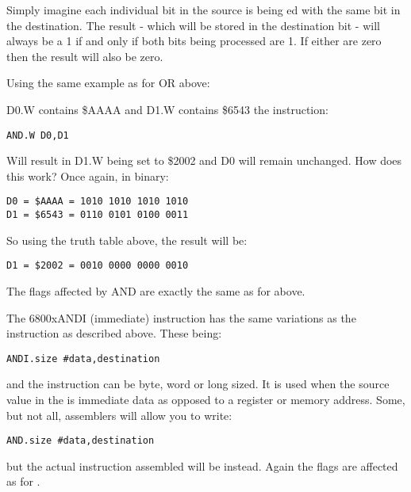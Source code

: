Simply imagine each individual bit in the source is being ed with
    the same bit in the destination. The result -{} which will be stored in the
    destination bit -{} will always be a 1 if and only if both bits being
    processed are 1. If either are zero then the result will also be
    zero.

Using the same example as for OR above:

D0.W contains \$AAAA and D1.W contains \$6543 the instruction:

\begin{lstlisting}[firstnumber=1,]
          AND.W D0,D1
\end{lstlisting}

Will result in D1.W being set to \$2002 and D0 will remain unchanged.
    How does this work? Once again, in binary:

\begin{lstlisting}[firstnumber=1,frame=none,numbers=none]
D0 = $AAAA = 1010 1010 1010 1010
D1 = $6543 = 0110 0101 0100 0011
\end{lstlisting}

So using the truth table above, the result will be:

\begin{lstlisting}[firstnumber=1,frame=none,numbers=none]
D1 = $2002 = 0010 0000 0000 0010
\end{lstlisting}

The flags affected by AND are exactly the same as for 
    above.

The \mc6800x{ANDI} (immediate) instruction has the same variations as the  instruction as described above. These being:

\begin{lstlisting}[firstnumber=1,]
          ANDI.size #data,destination
\end{lstlisting}

and the instruction can be byte, word or long sized. It is used when the source
    value in the  is immediate data as opposed to a register or memory
    address. Some, but not all, assemblers will allow you to write:

\begin{lstlisting}[firstnumber=1,]
          AND.size #data,destination
\end{lstlisting}

but the actual instruction assembled will be  instead. Again the
    flags are affected as for .

